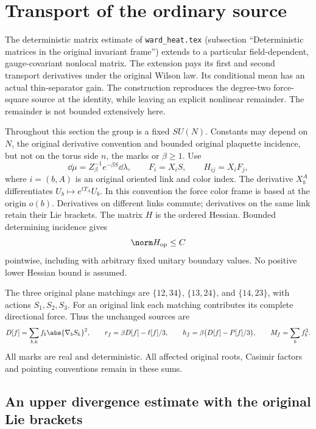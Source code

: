 \section{Transport of the ordinary source}
\label{tr:section}

The deterministic matrix estimate of \texttt{ward\_heat.tex} (subsection ``Deterministic matrices in the original invariant frame'') extends to a particular
field-dependent, gauge-covariant nonlocal matrix. The extension pays its first
and second transport derivatives under the original Wilson law. Its conditional
mean has an actual thin-separator gain. The construction reproduces the
degree-two force-square source at the identity, while leaving an explicit
nonlinear remainder. The remainder is not bounded extensively here.

Throughout this section the group is a fixed \(SU(N)\). Constants may depend on
\(N\), the original derivative convention and bounded original plaquette
incidence, but not on the torus side \(n\), the marks or \(\beta\ge1\). Use
\[
 \dd\mu=Z_\beta^{-1}e^{-\beta S}\dd\lambda,
 \qquad F_i=X_iS,\qquad H_{ij}=X_iF_j,
\]
where \(i=(b,A)\) is an original oriented link and color index. The derivative
\(X_b^A\) differentiates \(U_b\mapsto e^{tT_A}U_b\). In this convention the
force color frame is based at the origin \(o(b)\). Derivatives on different
links commute; derivatives on the same link retain their Lie brackets.
The matrix \(H\) is the ordered Hessian. Bounded determining incidence gives
\begin{equation}
 \norm H_{\rm op}\le C
 \label{tr:hessian}
\end{equation}
pointwise, including with arbitrary fixed unitary boundary values. No positive
lower Hessian bound is assumed.

The three original plane matchings are
\(\{12,34\}\), \(\{13,24\}\), and \(\{14,23\}\), with actions
\(S_1,S_2,S_3\). For an original link each matching contributes its complete
directional force. Thus the unchanged sources are
\[
 D[f]=\sum_{b,k}f_b\abs{\nabla_bS_k}^2,\qquad
 r_f=\beta D[f]-\ell[f]/3,\qquad
 h_f=\beta\bigl(D[f]-P[f]/3\bigr),\qquad M_f=\sum_bf_b^2.
\]
All marks are real and deterministic. All affected original roots, Casimir
factors and pointing conventions remain in these sums.

\subsection{An upper divergence estimate with the original Lie brackets}

